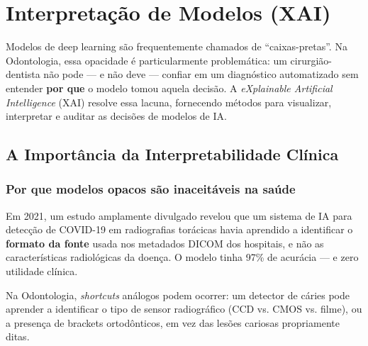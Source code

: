 \chapter{Interpretação de Modelos (XAI)}
\label{cap:interpretacao-modelos}
\nivelquatro

Modelos de deep learning são frequentemente chamados de ``caixas-pretas''.
Na Odontologia, essa opacidade é particularmente problemática: um
cirurgião-dentista não pode — e não deve — confiar em um diagnóstico
automatizado sem entender \textbf{por que} o modelo tomou aquela decisão.
A \textit{eXplainable Artificial Intelligence} (XAI) resolve essa lacuna,
fornecendo métodos para visualizar, interpretar e auditar as decisões
de modelos de IA.

 

\section{A Importância da Interpretabilidade Clínica}

\subsection{Por que modelos opacos são inaceitáveis na saúde}

Em 2021, um estudo amplamente divulgado revelou que um sistema de IA
para detecção de COVID-19 em radiografias torácicas havia aprendido a
identificar o \textbf{formato da fonte} usada nos metadados DICOM dos
hospitais, e não as características radiológicas da doença. O modelo
tinha 97\% de acurácia — e zero utilidade clínica.


 

Na Odontologia, \textit{shortcuts} análogos podem ocorrer: um detector de
cáries pode aprender a identificar o tipo de sensor radiográfico (CCD vs.
CMOS vs. filme), ou a presença de brackets ortodônticos, em vez das lesões
cariosas propriamente ditas.

